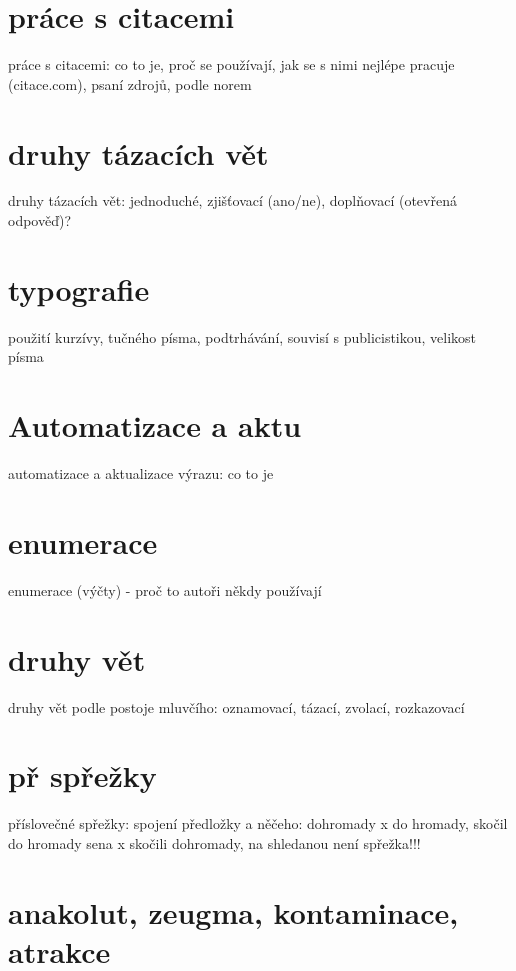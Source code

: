 \documentclass{memoir}
\begin{document}
\section*{práce s citacemi}
práce s citacemi: co to je, proč se používají, jak se s nimi nejlépe pracuje (citace.com), psaní zdrojů, podle norem

\section*{druhy tázacích vět}
druhy tázacích vět: jednoduché, zjišťovací (ano/ne), doplňovací (otevřená odpověď)?

\section*{typografie}
použití kurzívy, tučného písma, podtrhávání, souvisí s publicistikou, velikost písma

\section*{Automatizace a aktu}
automatizace a aktualizace výrazu: co to je

\section*{enumerace}
enumerace (výčty) - proč to autoři někdy používají

\section*{druhy vět}
druhy vět podle postoje mluvčího: oznamovací, tázací, zvolací, rozkazovací

\section*{př spřežky}
příslovečné spřežky: spojení předložky a něčeho: dohromady x do hromady, skočil do hromady sena x skočili dohromady, na shledanou není spřežka!!!

\section*{anakolut, zeugma, kontaminace, atrakce}
\end{document}
